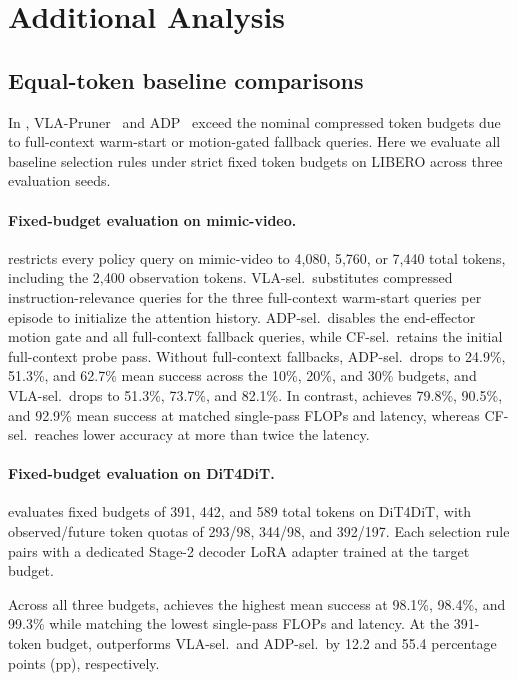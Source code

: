 \section{Additional Analysis}
\label{app:add_analysis}

\subsection{Equal-token baseline comparisons}
\label{app:supp_equal_token}
    In , VLA-Pruner~\cite{liu2025vlapruner} and ADP~\cite{pei2026adp} exceed the nominal compressed token budgets due to full-context warm-start or motion-gated fallback queries.
    Here we evaluate all baseline selection rules under strict fixed token budgets on LIBERO across three evaluation seeds.

\paragraph{Fixed-budget evaluation on mimic-video.}
     restricts every policy query on mimic-video to 4,080, 5,760, or 7,440 total tokens, including the 2,400 observation tokens.
    VLA-sel.\ substitutes compressed instruction-relevance queries for the three full-context warm-start queries per episode to initialize the attention history.
    ADP-sel.\ disables the end-effector motion gate and all full-context fallback queries, while CF-sel.\ retains the initial full-context probe pass.
    Without full-context fallbacks, ADP-sel.\ drops to 24.9\%, 51.3\%, and 62.7\% mean success across the 10\%, 20\%, and 30\% budgets, and VLA-sel.\ drops to 51.3\%, 73.7\%, and 82.1\%.
    In contrast, \method achieves 79.8\%, 90.5\%, and 92.9\% mean success at matched single-pass FLOPs and latency, whereas CF-sel.\ reaches lower accuracy at more than twice the latency.




\paragraph{Fixed-budget evaluation on DiT4DiT.}
     evaluates fixed budgets of 391, 442, and 589 total tokens on DiT4DiT, with observed/future token quotas of 293/98, 344/98, and 392/197.
    Each selection rule pairs with a dedicated Stage-2 decoder LoRA adapter trained at the target budget.
    
    Across all three budgets, \method achieves the highest mean success at 98.1\%, 98.4\%, and 99.3\% while matching the lowest single-pass FLOPs and latency.
    At the 391-token budget, \method outperforms VLA-sel.\ and ADP-sel.\ by 12.2 and 55.4 percentage points (pp), respectively.
    


